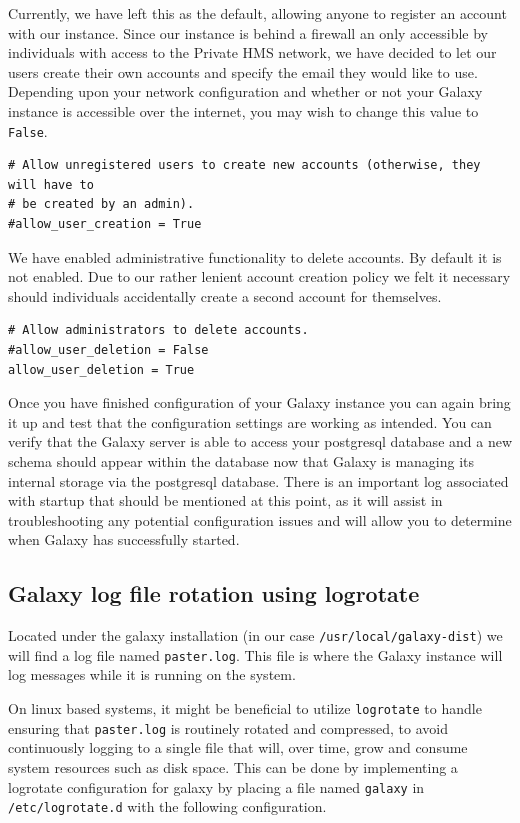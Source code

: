 \documentclass[a4paper,10pt]{article}
\begin{document}
Currently, we have left this as the default, allowing anyone to register an account with our instance.  Since our instance is behind a firewall an only accessible by individuals with access to the Private HMS network, we have decided to let our users create their own accounts and specify the email they would like to use.  Depending upon your network configuration and whether or not your Galaxy instance is accessible over the internet, you may wish to change this value to \texttt{False}.
\begin{lstlisting}
# Allow unregistered users to create new accounts (otherwise, they will have to
# be created by an admin).
#allow_user_creation = True
\end{lstlisting}

We have enabled administrative functionality to delete accounts.  By default it is not enabled.  Due to our rather lenient account creation policy we felt it necessary should individuals accidentally create a second account for themselves.
\begin{lstlisting}
# Allow administrators to delete accounts.
#allow_user_deletion = False
allow_user_deletion = True
\end{lstlisting}

Once you have finished configuration of your Galaxy instance you can again bring it up and test that the configuration settings are working as intended.  You can verify that the Galaxy server is able to access your postgresql database and a new schema should appear within the database now that Galaxy is managing its internal storage via the postgresql database.  There is an important log associated with startup that should be mentioned at this point, as it will assist in troubleshooting any potential configuration issues and will allow you to determine when Galaxy has successfully started.

\subsection{Galaxy log file rotation using logrotate}
Located under the galaxy installation (in our case \texttt{\footnotesize{/usr/local/galaxy-dist}})  we will find a log file named \texttt{\footnotesize{paster.log}}.  This file is where the Galaxy instance will log messages while it is running on the system.

On linux based systems, it might be beneficial to utilize \texttt{\footnotesize{logrotate}} to handle ensuring that \texttt{\footnotesize{paster.log}} is routinely rotated and compressed, to avoid continuously logging to a single file that will, over time, grow and consume system resources such as disk space.  This can be done by implementing a logrotate configuration for galaxy by placing a file named \texttt{\footnotesize{galaxy}} in \texttt{\footnotesize{/etc/logrotate.d}} with the following configuration.
\end{document}
